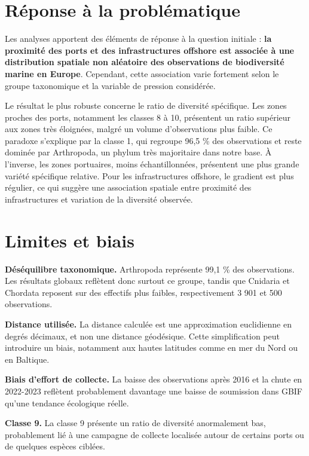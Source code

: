 \documentclass[mstat,12pt]{unswthesis}
\begin{document}
\section{Réponse à la
problématique}\label{ruxe9ponse-uxe0-la-probluxe9matique}

Les analyses apportent des éléments de réponse à la question initiale :
\textbf{la proximité des ports et des infrastructures offshore est
associée à une distribution spatiale non aléatoire des observations de
biodiversité marine en Europe}. Cependant, cette association varie
fortement selon le groupe taxonomique et la variable de pression
considérée.

Le résultat le plus robuste concerne le ratio de diversité spécifique.
Les zones proches des ports, notamment les classes 8 à 10, présentent un
ratio supérieur aux zones très éloignées, malgré un volume
d'observations plus faible. Ce paradoxe s'explique par la classe 1, qui
regroupe 96,5 \% des observations et reste dominée par Arthropoda, un
phylum très majoritaire dans notre base. À l'inverse, les zones
portuaires, moins échantillonnées, présentent une plus grande variété
spécifique relative. Pour les infrastructures offshore, le gradient est
plus régulier, ce qui suggère une association spatiale entre proximité
des infrastructures et variation de la diversité observée.

\section{Limites et biais}\label{limites-et-biais}

\textbf{Déséquilibre taxonomique.} Arthropoda représente 99,1 \% des
observations. Les résultats globaux reflètent donc surtout ce groupe,
tandis que Cnidaria et Chordata reposent sur des effectifs plus faibles,
respectivement 3 901 et 500 observations.

\textbf{Distance utilisée.} La distance calculée est une approximation
euclidienne en degrés décimaux, et non une distance géodésique. Cette
simplification peut introduire un biais, notamment aux hautes latitudes
comme en mer du Nord ou en Baltique.

\textbf{Biais d'effort de collecte.} La baisse des observations après
2016 et la chute en 2022-2023 reflètent probablement davantage une
baisse de soumission dans GBIF qu'une tendance écologique réelle.

\textbf{Classe 9.} La classe 9 présente un ratio de diversité
anormalement bas, probablement lié à une campagne de collecte localisée
autour de certains ports ou de quelques espèces ciblées.
\end{document}
